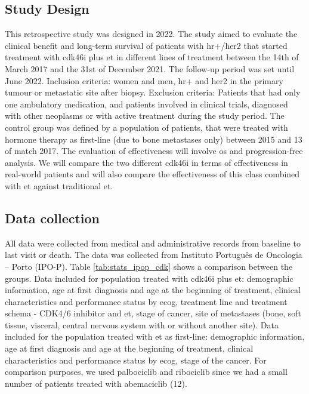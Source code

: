 

\subsection{Study Design}

This retrospective study was designed in 2022. The study aimed to evaluate the clinical benefit and long-term survival of patients with \ac{hr+}/\ac{her2} that started treatment with \ac{cdk46i} plus \ac{et} in different lines of treatment between the 14th of March 2017 and the 31st of December 2021. The follow-up period was set until June 2022. Inclusion criteria: women and men, \ac{hr+} and \ac{her2} in the primary tumour or metastatic site after biopsy. Exclusion criteria: Patients that had only one ambulatory medication, and patients involved in clinical trials, diagnosed with other neoplasms or with active treatment during the study period. The control group was defined by a population of patients, that were treated with hormone therapy as first-line (due to bone metastases only) between 2015 and 13 of match 2017.
The evaluation of effectiveness will involve \ac{os} and progression-free analysis. We will compare the two different \ac{cdk46i} in terms of effectiveness in real-world patients and will also compare the effectiveness of this class combined with \ac{et} against traditional \ac{et}.


\subsection{Data collection}
All data were collected from medical and administrative records from baseline to last visit or death. The data was collected from Instituto Português de Oncologia – Porto (IPO-P). Table \ref{tab:stats_ipop_cdk} shows a comparison between the groups.
Data included for population treated with \ac{cdk46i} plus \ac{et}: demographic information, age at first diagnosis and age at the beginning of treatment, clinical characteristics and performance status by  \ac{ecog}, treatment line and treatment schema - CDK4/6 inhibitor and \ac{et}, stage of cancer, site of metastases (bone, soft tissue, visceral, central nervous system with or without another site).
Data included for the population treated with \ac{et} as first-line: demographic information, age at first diagnosis and age at the beginning of treatment, clinical characteristics and performance status by  \ac{ecog}, stage of the cancer.
For comparison purposes, we used palbociclib and ribociclib since we had a small number of patients treated with abemaciclib (12).

